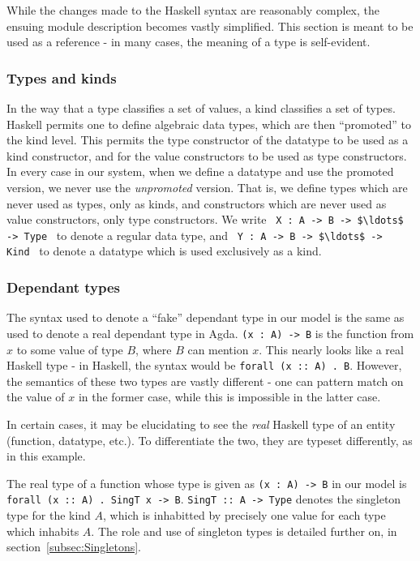 \documentclass[12pt, svgnames]{article}
\let\Oldsubsubsection\subsubsection
\renewcommand{\subsubsection}{\FloatBarrier\Oldsubsubsection}
\begin{document}
While the changes made to the Haskell syntax are reasonably complex, the ensuing 
module description becomes vastly simplified. This section is meant to be used
as a reference - in many cases, the meaning of a type is self-evident. 

\subsubsection*{Types and kinds}
In the way that a type classifies a set of values, a kind classifies a set of
types. Haskell permits one to define algebraic data types, which are then ``promoted''
to the kind level. This permits the type constructor of the datatype to be used
as a kind constructor, and for the value constructors to be used as type constructors. 
In every case in our system, when we define a datatype and use the promoted version,
we never use the \emph{unpromoted} version. That is, we define types which are never
used as types, only as kinds, and constructors which are never used as value constructors,
only type constructors. We write \,\,\,\lstinline!X : A -> B -> $\ldots$ -> Type!\,\,\, to denote
a regular data type, and \,\,\,\lstinline!Y : A -> B -> $\ldots$ -> Kind!\,\,\, to denote a datatype
which is used exclusively as a kind. 

\subsubsection*{Dependant types}
The syntax used to denote a ``fake'' dependant type in our model is the same 
as used to denote a real dependant type in Agda. \lstinline!(x : A) -> B! is the function
from $x$ to some value of type $B$, where $B$ can mention $x$. This nearly looks like a 
real Haskell type - in Haskell, the syntax would be \texttt{forall (x :: A) . B}. However, 
the semantics of these two types are vastly different - one can pattern match
on the value of $x$ in the former case, while this is impossible in the latter case. 

In certain cases, it may be elucidating to see the \emph{real} Haskell type of
an entity (function, datatype, etc.). To differentiate the two, they are typeset
differently, as in this example.

The real type of a function whose type is given as \lstinline!(x : A) -> B! in
our model is \texttt{forall (x :: A) . SingT x -> B}. \texttt{SingT :: A -> Type}
denotes the singleton type for the kind $A$, which is inhabitted by precisely
one value for each type which inhabits $A$. The role and use of singleton types
is detailed further on, in section~\ref{subsec:Singletons}. 
\end{document}
